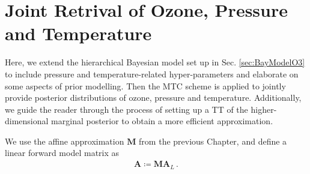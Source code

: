 \chapter{Joint Retrival of Ozone, Pressure and Temperature}
\label{ch:FullBay}
\thispagestyle{empty}
Here, we extend the hierarchical Bayesian model set up in Sec. \ref{sec:BayModelO3} to include pressure and temperature-related hyper-parameters and elaborate on some aspects of prior modelling.
Then the MTC scheme is applied to jointly provide posterior distributions of ozone, pressure and temperature.
Additionally, we guide the reader through the process of setting up a TT of the higher-dimensional marginal posterior to obtain a more efficient approximation.

We use the affine approximation $\bm{M}$ from the previous Chapter, and define a linear forward model matrix as
\begin{align}
	\bm{A}  \coloneqq \bm{M A}_L \, .
\end{align}

